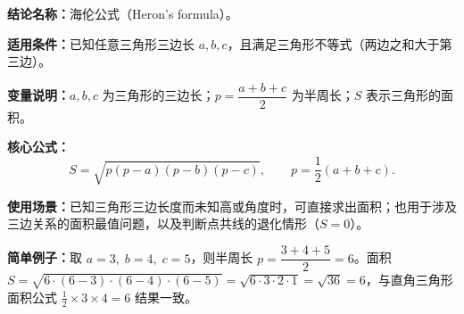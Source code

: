 \textbf{结论名称：}海伦公式（Heron's formula）。

\textbf{适用条件：}已知任意三角形三边长 \(a, b, c\)，且满足三角形不等式（两边之和大于第三边）。

\textbf{变量说明：}\(a, b, c\) 为三角形的三边长；\(p = \dfrac{a+b+c}{2}\) 为半周长；\(S\) 表示三角形的面积。

\textbf{核心公式：}\[
\boxed{S = \sqrt{p(p-a)(p-b)(p-c)}},\qquad p = \frac{1}{2}(a+b+c).
\]

\textbf{使用场景：}已知三角形三边长度而未知高或角度时，可直接求出面积；也用于涉及三边关系的面积最值问题，以及判断点共线的退化情形（\(S=0\)）。

\textbf{简单例子：}取 \(a=3,\; b=4,\; c=5\)，则半周长 \(p = \dfrac{3+4+5}{2}=6\)。面积 \(S = \sqrt{6 \cdot (6-3) \cdot (6-4) \cdot (6-5)} = \sqrt{6 \cdot 3 \cdot 2 \cdot 1} = \sqrt{36} = 6\)，与直角三角形面积公式 \(\frac{1}{2}\times 3 \times 4 = 6\) 结果一致。